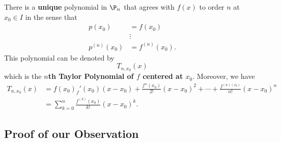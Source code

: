 There is a \textbf{unique} polynomial in \( {\P}_{n} \) that agrees with \( f(x) \) to order \( n  \) at \( {x}_{0} \in I  \) in the sense that 
\begin{align*}
    p({x}_{0}) &= f({x}_{0} ) \\
               &\vdots \\
    p^{(n)}({x}_{0}) &= f^{(n)}({x}_{0}).
\end{align*}
This polynomial can be denoted by 
\[  {T}_{n, {x}_{0}}  (x)\]
which is the \textbf{\( n \)th Taylor Polynomial of \( f  \) centered at \( {x}_{0} \)}. Moreover, we have   
\begin{align*}
    {T}_{n,{x}_{0}}(x)  &= f({x}_{0}) _ f'({x}_{0}) (x - {x}_{0}) + \frac{ f''({x}_{0}) }{ 2!  } (x - {x}_{0})^{2} + \cdots + \frac{ f^{(n)({x}_{0}) } }{ n!  } (x - {x}_{0})^{n}   \\
                        &= \sum_{ k= 0  }^{ n } \frac{ f^{(k)}({x}_{0}) }{ k !  }  (x - {x}_{0})^{k}.
\end{align*}

\subsection{Proof of our Observation}

